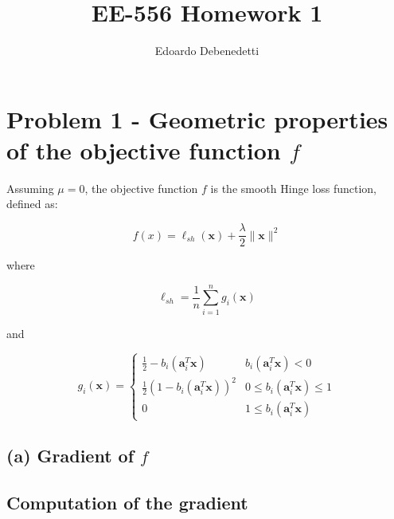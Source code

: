 \documentclass[12pt]{article}
\title{EE-556 Homework 1}
\author{Edoardo Debenedetti}
\newcommand{\xb}{\mathbf{x}}
\newcommand{\ab}{\mathbf{a}}
\newcommand{\abi}{\ab_i}
\newcommand{\xnorm}{\lVert \mathbf{\xb} \rVert}
\newcommand{\sumin}{\sum_{i = 1}^n}
\newcommand{\ellsh}{\ell_{sh}}
\newcommand{\ax}{\abi^T\xb}
\begin{document}
\maketitle

\vspace{0.5in}



\section*{Problem 1 - Geometric properties of the objective function $f$}

Assuming $\mu = 0$, the objective function $f$ is the smooth Hinge loss function, defined as:

\begin{equation} \label{def:hinge_loss}
    f(x) = \ellsh(\xb) + \frac{\lambda}{2} \xnorm ^ 2
\end{equation}

where

\begin{equation} \label{def:l}
    \ellsh = \frac{1}{n} \sumin g_i(\xb)
\end{equation}

and

\begin{equation}
    g_i(\xb) = \begin{cases} \label{def:g}
    \frac{1}{2} - b_i(\ax)         & b_i(\ax) < 0 \\
    \frac{1}{2}(1 - b_i(\ax))^2    & 0 \leq b_i(\ax) \leq 1 \\
    0                                   & 1 \le b_i(\ax)
\end{cases}
\end{equation}

\subsection*{(a) Gradient of $f$}

\subsection*{Computation of the gradient}
\end{document}
